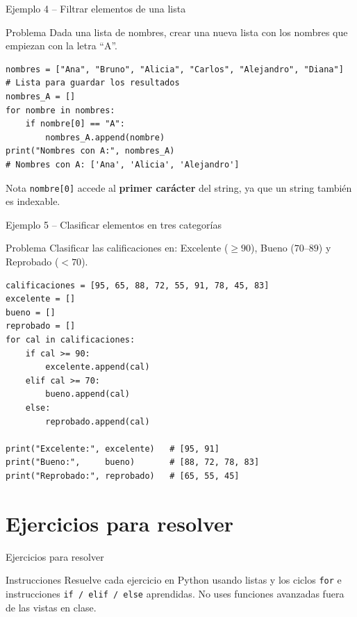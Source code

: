 \documentclass[aspectratio=169,xcolor=dvipsnames]{beamer}
\begin{document}
\begin{frame}[fragile]{Ejemplo 4 -- Filtrar elementos de una lista}
    \begin{exampleblock}{Problema}
        Dada una lista de nombres, crear una nueva lista con los nombres que empiezan con la letra ``A''.
    \end{exampleblock}
\begin{lstlisting}[style=PythonStyle]
nombres = ["Ana", "Bruno", "Alicia", "Carlos", "Alejandro", "Diana"]
# Lista para guardar los resultados
nombres_A = []
for nombre in nombres:
    if nombre[0] == "A":
        nombres_A.append(nombre)
print("Nombres con A:", nombres_A)
# Nombres con A: ['Ana', 'Alicia', 'Alejandro']
\end{lstlisting}
    \begin{alertblock}{Nota}
        \texttt{nombre[0]} accede al \textbf{primer carácter} del string, ya que un string también es indexable.
    \end{alertblock}
\end{frame}

\begin{frame}[fragile]{Ejemplo 5 -- Clasificar elementos en tres categorías}
    \begin{exampleblock}{Problema}
        Clasificar las calificaciones en: Excelente ($\geq 90$), Bueno ($70$--$89$) y Reprobado ($< 70$).
    \end{exampleblock}
\begin{lstlisting}[style=PythonStyle]
calificaciones = [95, 65, 88, 72, 55, 91, 78, 45, 83]
excelente = []
bueno = []
reprobado = []
for cal in calificaciones:
    if cal >= 90:
        excelente.append(cal)
    elif cal >= 70:
        bueno.append(cal)
    else:
        reprobado.append(cal)

print("Excelente:", excelente)   # [95, 91]
print("Bueno:",     bueno)       # [88, 72, 78, 83]
print("Reprobado:", reprobado)   # [65, 55, 45]
\end{lstlisting}
\end{frame}

\section{Ejercicios para resolver}

\begin{frame}{Ejercicios para resolver}
    \begin{alertblock}{Instrucciones}
        Resuelve cada ejercicio en Python usando listas y los ciclos \texttt{for} e instrucciones \texttt{if / elif / else} aprendidas. No uses funciones avanzadas fuera de las vistas en clase.
    \end{alertblock}
\end{frame}
\end{document}

